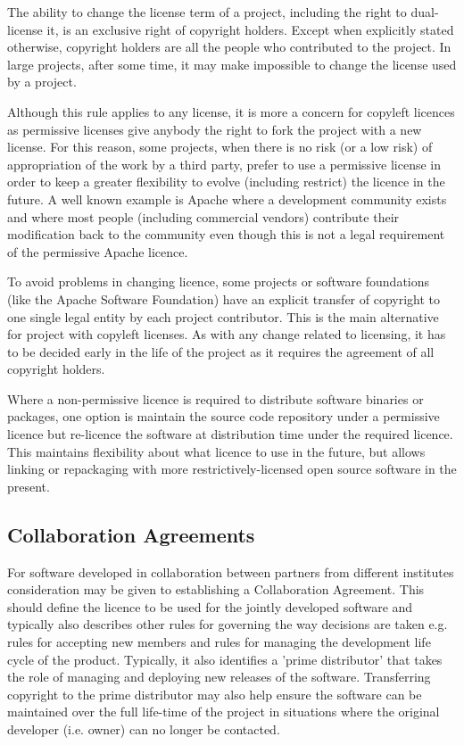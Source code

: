 \documentclass[12pt,a4paper]{article}
\begin{document}
The ability to change the license term of a project, including the right to dual-license it, is an exclusive right of copyright holders. Except when explicitly stated otherwise, copyright holders are all the people who contributed to the project. In large projects, after some time, it may make impossible to change the license used by a project.

Although this rule applies to any license, it is more a concern for copyleft licences as permissive licenses give anybody the right to fork the project with a new license. For this reason, some projects, when there is no risk (or a low risk) of appropriation of the work by a third party, prefer to use a permissive license in order to keep a greater flexibility to evolve (including restrict) the licence in the future. A well known example is Apache where a development community exists and where most people (including commercial vendors) contribute their modification back to the community even though this is not a legal requirement of the permissive Apache licence.

To avoid problems in changing licence, some projects or software foundations (like the Apache Software Foundation) have an explicit transfer of copyright to one single legal entity by each project contributor. This is the main alternative for project with copyleft licenses. As with any change related to licensing, it has to be decided early in the life of the project as it requires the agreement of all copyright holders.

Where a non-permissive licence is required to distribute software binaries or packages, one option is maintain the source code repository under a permissive licence but re-licence the software at distribution time under the required licence. This maintains flexibility about what licence to use in the future, but allows linking or repackaging with more restrictively-licensed open source software in the present.

\subsection{Collaboration Agreements}
\label{sec:CollaborationAgreements}

For software developed in collaboration between partners from different institutes consideration may be given to establishing a Collaboration Agreement. This should define the licence to be used for the jointly developed software and typically also describes other rules for governing the way decisions are taken e.g. rules for accepting new members and rules for managing the development life cycle of the product. Typically, it also identifies a 'prime distributor' that takes the role of managing and deploying new releases of the software. Transferring copyright to the prime distributor may also help ensure the software can be maintained over the full life-time of the project in situations where the original developer (i.e. owner) can no longer be contacted.
\end{document}
